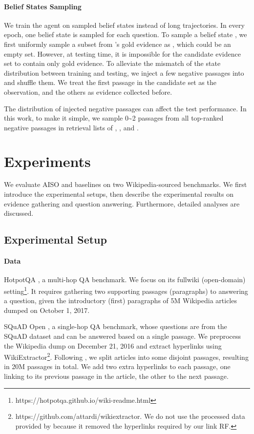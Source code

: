 \documentclass[11pt]{article}
\begin{document}
\paragraph{Belief States Sampling}
We train the agent on sampled belief states instead of long trajectories.
In every epoch, one belief state is sampled for each question.
To sample a belief state , we first uniformly sample a subset from 's gold evidence as , which could be an empty set.
However, at testing time, it is impossible for the candidate evidence set  to contain only gold evidence.
To alleviate the mismatch of the state distribution between training and testing, we inject a few negative passages into  and shuffle them.
We treat the first passage in the candidate set as the observation, and the others as evidence collected before.

The distribution of injected negative passages can affect the test performance.
In this work, to make it simple, we sample 0\textasciitilde2 passages from all top-ranked negative passages in retrieval lists of , , and .


\section{Experiments}
We evaluate AISO and baselines on two Wikipedia-sourced benchmarks. 
We first introduce the experimental setups, then describe the experimental results on evidence gathering and question answering. 
Furthermore, detailed analyses are discussed. 

\subsection{Experimental Setup}

\paragraph{Data}
HotpotQA \citep{yang-etal-2018-hotpotqa}, a multi-hop QA benchmark. We focus on its fullwiki (open-domain) setting\footnote{https://hotpotqa.github.io/wiki-readme.html}.
It requires gathering two supporting passages (paragraphs) to answering a question, given the introductory (first) paragraphs of 5M Wikipedia articles dumped on October 1, 2017. 

SQuAD Open \citep{chen-etal-2017-reading}, a single-hop QA benchmark, whose questions are from the SQuAD dataset \citep{rajpurkar-etal-2016-squad} and can be answered based on a single passage. 
We preprocess the Wikipedia dump on December 21, 2016 and extract hyperlinks using WikiExtractor\footnote{https://github.com/attardi/wikiextractor. We do not use the processed data provided by \citet{chen-etal-2017-reading} because it removed the hyperlinks required by our link RF.}.
Following \citet{karpukhin-etal-2020-dense}, we split articles into some disjoint passages, resulting in 20M passages in total. 
We add two extra hyperlinks to each passage, one linking to its previous passage in the article, the other to the next passage.
\end{document}
